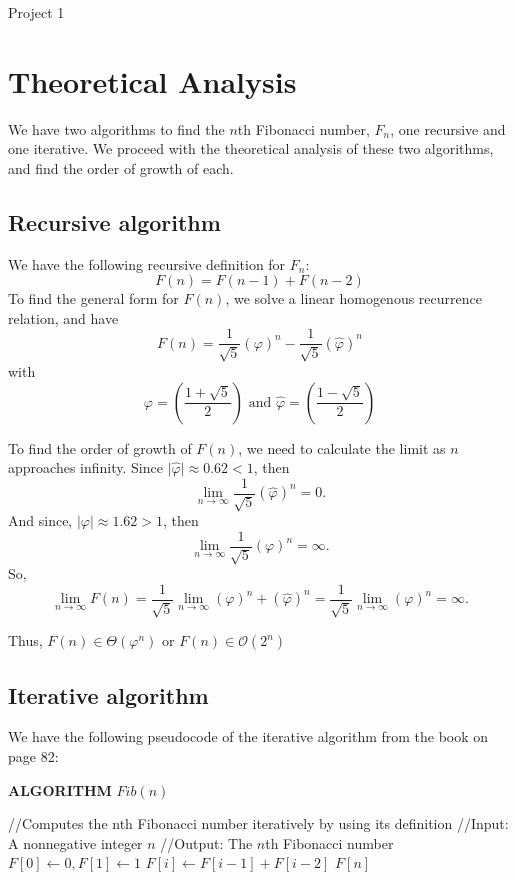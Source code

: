 \documentclass[letterpaper, 11pt]{article}
\newcommand{\abs}[1]{\lvert #1 \rvert}
\begin{document}
\begin{center}
	{\LARGE Project 1}\\
\end{center}

\section*{Theoretical Analysis}
We have two algorithms to find the \(n\)th Fibonacci number, \(F_n\), one recursive and
one iterative. We proceed with the theoretical analysis of these two
algorithms, and find the order of growth of each.

\subsection*{Recursive algorithm}
We have the following recursive definition for \(F_n\): 
\[F(n) = F(n - 1) + F(n - 2) \]
To find the general form for \(F(n)\), we solve a linear homogenous recurrence
relation, and have
\[F(n) = \frac{1}{\sqrt{5}}(\varphi) ^ n - 
\frac{1}{\sqrt{5}} (\hat{\varphi}) ^ n\]
with
\[\varphi = \left(\frac{1 + \sqrt{5}}{2} \right) \text{ and } 
\hat{\varphi} = \left(\frac{1 - \sqrt{5}}{2} \right)\]

To find the order of growth of \(F(n)\), we need to calculate the limit as
\(n\) approaches infinity. Since \(\abs{\hat{\varphi}} \approx 0.62 < 1\), then
\[\lim_{n \to \infty} \frac{1}{\sqrt{5}} (\hat{\varphi})^n = 0.\]
And since, \(\abs{\varphi} \approx 1.62 > 1\), then 
\[\lim_{n \to \infty} \frac{1}{\sqrt{5}} (\varphi)^n = \infty.\]
So,
\[\lim_{n \to \infty} F(n) = \frac{1}{\sqrt{5}}\lim_{n \to \infty}(\varphi)^n +
(\hat{\varphi})^n = \frac{1}{\sqrt{5}}\lim_{n \to \infty}(\varphi)^n = \infty.\]

\medskip

Thus, \(F(n) \in \Theta(\varphi^n)\) or \(F(n) \in \mathcal{O}(2^n)\)

\subsection*{Iterative algorithm}
We have the following pseudocode of the iterative algorithm from the book on
page 82:

\medskip
\noindent\textbf{ALGORITHM} \(Fib(n)\)
\begin{algorithmic}
    \State //Computes the nth Fibonacci number iteratively by using its definition
    \State //Input: A nonnegative integer \(n\)
    \State //Output: The \(n\)th Fibonacci number
    \State \(F[0] \gets 0, F[1] \gets 1\)
    \State \(F[i] \gets F[i - 1] + F[i - 2]\)
    \EndFor
    \State\Return \(F[n]\)
\end{algorithmic}
\medskip
\end{document}
